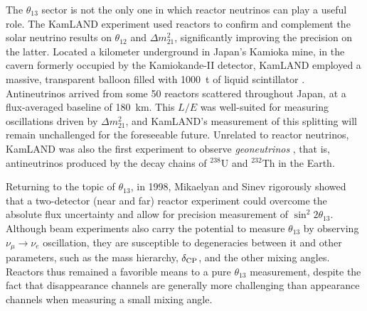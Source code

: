 \documentclass[../thesis.tex]{subfiles}
\begin{document}
The $\theta_{13}$ sector is not the only one in which reactor neutrinos can play a useful role. The KamLAND experiment used reactors to confirm and complement the solar neutrino results on $\theta_{12}$ and $\Delta m^2_{21}$, significantly improving the precision on the latter. Located a kilometer underground in Japan's Kamioka mine, in the cavern formerly occupied by the Kamiokande-II detector, KamLAND employed a massive, transparent balloon filled with 1000~t of liquid scintillator \cite{PhysRevLett.90.021802}. Antineutrinos arrived from some 50 reactors scattered throughout Japan, at a flux-averaged baseline of 180~km. This $L/E$ was well-suited for measuring oscillations driven by $\Delta m^2_{21}$, and KamLAND's measurement of this splitting will remain unchallenged for the foreseeable future. Unrelated to reactor neutrinos, KamLAND was also the first experiment to observe \emph{geoneutrinos} \cite{kamlandGeo}, that is, antineutrinos produced by the decay chains of $^{238}$U and $^{232}$Th in the Earth.

Returning to the topic of $\theta_{13}$, in 1998, Mikaelyan and Sinev \cite{Mikaelyan:1998yg} rigorously showed that a two-detector (near and far) reactor experiment could overcome the absolute flux uncertainty and allow for precision measurement of $\sin^2 2\theta_{13}$. Although beam experiments also carry the potential to measure $\theta_{13}$ by observing $\nu_\mu \to \nu_e$ oscillation, they are susceptible to degeneracies between it and other parameters, such as the mass hierarchy, $\delta_\text{CP}$, and the other mixing angles. Reactors thus remained a favorible means to a pure $\theta_{13}$ measurement, despite the fact that disappearance channels are generally more challenging than appearance channels when measuring a small mixing angle.
\end{document}
